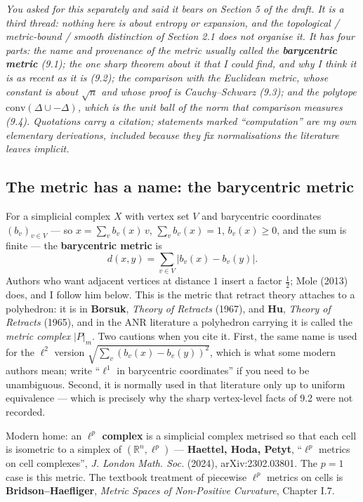 \documentclass[
]{article}
\begin{document}
\emph{You asked for this separately and said it bears on Section 5 of
the draft. It is a third thread: nothing here is about entropy or
expansion, and the topological / metric-bound / smooth distinction of
Section 2.1 does not organise it. It has four parts: the name and
provenance of the metric usually called the \textbf{barycentric metric}
(9.1); the one sharp theorem about it that I could find, and why I think
it is as recent as it is (9.2); the comparison with the Euclidean
metric, whose constant is about \(\sqrt n\) and whose proof is
Cauchy--Schwarz (9.3); and the polytope
\(\mathrm{conv}(\Delta\cup-\Delta)\), which is the unit ball of the norm
that comparison measures (9.4). Quotations carry a citation; statements
marked ``computation'' are my own elementary derivations, included
because they fix normalisations the literature leaves implicit.}

\subsection{The metric has a name: the barycentric
metric}\label{the-metric-has-a-name-the-barycentric-metric}

For a simplicial complex \(X\) with vertex set \(V\) and barycentric
coordinates \((b_v)_{v\in V}\) --- so \(x=\sum_v b_v(x)\,v\),
\(\sum_v b_v(x)=1\), \(b_v(x)\ge 0\), and the sum is finite --- the
\textbf{barycentric metric} is \[
d(x,y)=\sum_{v\in V}\lvert b_v(x)-b_v(y)\rvert .
\] Authors who want adjacent vertices at distance \(1\) insert a factor
\(\tfrac12\); Mole (2013) does, and I follow him below. This is the
metric that retract theory attaches to a polyhedron: it is in
\textbf{Borsuk}, \emph{Theory of Retracts} (1967), and \textbf{Hu},
\emph{Theory of Retracts} (1965), and in the ANR literature a polyhedron
carrying it is called the \emph{metric complex} \(|P|_m\). Two cautions
when you cite it. First, the same name is used for the \(\ell^2\)
version \(\sqrt{\sum_v(b_v(x)-b_v(y))^2}\), which is what some modern
authors mean; write ``\(\ell^1\) in barycentric coordinates'' if you
need to be unambiguous. Second, it is normally used in that literature
only up to uniform equivalence --- which is precisely why the sharp
vertex-level facts of 9.2 were not recorded.

Modern home: an \textbf{\(\ell^p\) complex} is a simplicial complex
metrised so that each cell is isometric to a simplex of
\((\mathbb R^n,\ell^p)\) --- \textbf{Haettel, Hoda, Petyt}, ``\(\ell^p\)
metrics on cell complexes'', \emph{J. London Math. Soc.} (2024),
arXiv:2302.03801. The \(p=1\) case is this metric. The textbook
treatment of piecewise \(\ell^p\) metrics on cells is
\textbf{Bridson--Haefliger}, \emph{Metric Spaces of Non-Positive
Curvature}, Chapter I.7.
\end{document}
